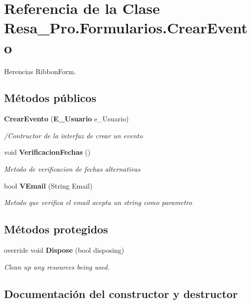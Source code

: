 \section{Referencia de la Clase Resa\+\_\+\+Pro.\+Formularios.\+Crear\+Evento}
\label{class_resa___pro_1_1_formularios_1_1_crear_evento}


Herencias Ribbon\+Form.

\subsection*{Métodos públicos}
\begin{DoxyCompactItemize}
\item 
{\bf Crear\+Evento} ({\bf E\+\_\+\+Usuario} e\+\_\+\+Usuario)
\begin{DoxyCompactList}\small\item\em /\+Contructor de la interfaz de crear un evento \end{DoxyCompactList}\item 
void {\bf Verificacion\+Fechas} ()
\begin{DoxyCompactList}\small\item\em Metodo de verificacion de fechas alternativas \end{DoxyCompactList}\item 
bool {\bf V\+Email} (String Email)
\begin{DoxyCompactList}\small\item\em Metodo que verifica el email acepta un string como parametro \end{DoxyCompactList}\end{DoxyCompactItemize}
\subsection*{Métodos protegidos}
\begin{DoxyCompactItemize}
\item 
override void {\bf Dispose} (bool disposing)
\begin{DoxyCompactList}\small\item\em Clean up any resources being used. \end{DoxyCompactList}\end{DoxyCompactItemize}


\subsection{Documentación del constructor y destructor}
